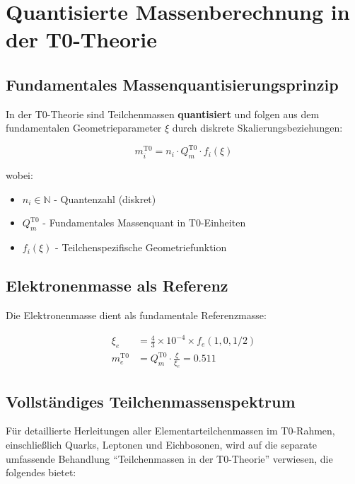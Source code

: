 \documentclass[12pt,a4paper]{article}
\begin{document}
	\section{Quantisierte Massenberechnung in der T0-Theorie}
	
	\subsection{Fundamentales Massenquantisierungsprinzip}
	
	In der T0-Theorie sind Teilchenmassen \textbf{quantisiert} und folgen aus dem fundamentalen Geometrieparameter $\xi$ durch diskrete Skalierungsbeziehungen:
	
	\begin{equation}
		m_i^{\mathrm{T0}} = n_i \cdot Q_m^{\mathrm{T0}} \cdot f_i(\xi)
	\end{equation}
	
	wobei:
	\begin{itemize}
		\item $n_i \in \mathbb{N}$ - Quantenzahl (diskret)
		\item $Q_m^{\mathrm{T0}}$ - Fundamentales Massenquant in T0-Einheiten
		\item $f_i(\xi)$ - Teilchenspezifische Geometriefunktion
	\end{itemize}
	
	\subsection{Elektronenmasse als Referenz}
	
	Die Elektronenmasse dient als fundamentale Referenzmasse:
	
	\begin{align}
		\xi_e &= \frac{4}{3} \times 10^{-4} \times f_e(1,0,1/2) \\
		m_e^{\mathrm{T0}} &= Q_m^{\mathrm{T0}} \cdot \frac{\xi}{\xi_e} = 0.511
	\end{align}
	
	\subsection{Vollständiges Teilchenmassenspektrum}
	
	Für detaillierte Herleitungen aller Elementarteilchenmassen im T0-Rahmen, einschließlich Quarks, Leptonen und Eichbosonen, wird auf die separate umfassende Behandlung ``Teilchenmassen in der T0-Theorie'' verwiesen, die folgendes bietet:
	
\end{document}
